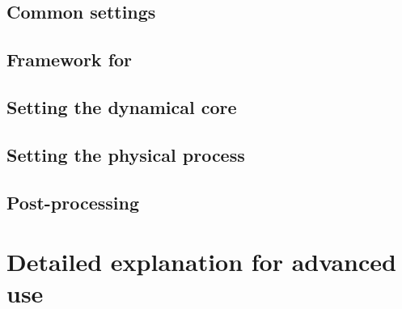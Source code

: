 \documentclass[a4paper]{report}
\begin{document}
 \chapter{Common settings}
 
 
 
 

 \chapter{Framework for \scalerm}
 
 
 
 
 
 \clearpage
 
 
 
 
 
 
 
 

% 

 \chapter{Setting the dynamical core}
 

 \chapter{Setting the physical process} \label{sec:basic_usel_physics}
 
 
 
 
 
 
 

 \chapter{Post-processing} \label{sec:basic_usel_post}
 


\part{Detailed explanation for advanced use} \label{part:advance_use}
\end{document}
